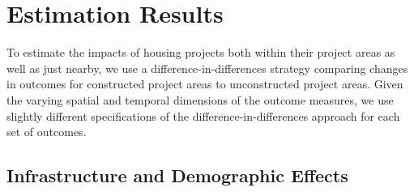 \documentclass[12pt]{article}
\begin{document}





 





\section{Estimation Results}\label{section:results}

To estimate the impacts of housing projects both within their project areas as well as just nearby, we use a difference-in-differences strategy comparing changes in outcomes for constructed project areas to unconstructed project areas.  Given the varying spatial and temporal dimensions of the outcome measures, we use slightly different specifications of the difference-in-differences approach for each set of outcomes.

\subsection{Infrastructure and Demographic Effects}\label{section:resultscensus}
\end{document}

